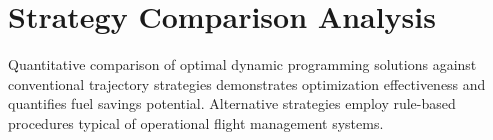 \section{Strategy Comparison Analysis}

Quantitative comparison of optimal dynamic programming solutions against conventional trajectory strategies demonstrates optimization effectiveness and quantifies fuel savings potential. Alternative strategies employ rule-based procedures typical of operational flight management systems.
